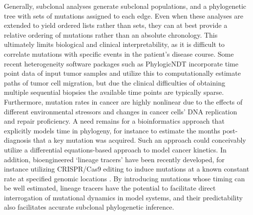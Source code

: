 Generally, subclonal analyses generate subclonal populations, and a phylogenetic tree with sets of mutations assigned to each edge. Even when these analyses are extended to yield ordered lists rather than sets, they can at best provide a relative ordering of mutations rather than an absolute chronology. This ultimately limits biological and clinical interpretability, as it is difficult to correlate mutations with specific events in the patient's disease course. Some recent heterogeneity software packages such as PhylogicNDT \cite{leshchiner2019} incorporate time point data of input tumor samples and utilize this to computationally estimate paths of tumor cell migration, but due the clinical difficulties of obtaining multiple sequential biopsies the available time points are typically sparse. Furthermore, mutation rates in cancer are highly nonlinear due to the effects of different environmental stressors and changes in cancer cells' DNA replication and repair proficiency. A need remains for a bioinformatics approach that explicitly models time in phylogeny, for instance to estimate the months post-diagnosis that a key mutation was acquired. Such an approach could conceivably utilize a differential equations-based approach \cite{steely2013} to model cancer kinetics. In addition, bioengineered `lineage tracers' have been recently developed, for instance utilizing CRISPR/Cas9 editing to induce mutations at a known constant rate at specified genomic locations \cite{quinn2021}. By introducing mutations whose timing can be well estimated, lineage tracers have the potential to facilitate direct interrogation of mutational dynamics in model systems, and their predictability also facilitates accurate subclonal phylogenetic inference.

